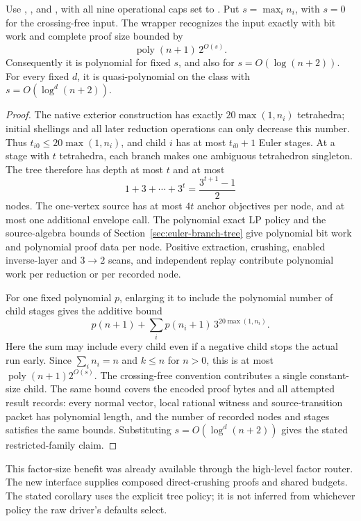 \begin{corollary}
\label{cor:factored-crushing-small-factors}
Use , ,
 and , with all
nine operational caps set to .  Put
$s=\max_i n_i$, with $s=0$ for the crossing-free input.  The wrapper
recognizes the input exactly with bit work and complete proof size bounded by
\[
 \operatorname{poly}(n+1)\,2^{O(s)}.
\]
Consequently it is polynomial for fixed $s$, and also for
$s=O(\log(n+2))$.  For every fixed $d$, it is quasi-polynomial on the
class with $s=O(\log^d(n+2))$.
\end{corollary}
\begin{proof}
The native exterior construction has exactly $20\max(1,n_i)$ tetrahedra;
initial shellings and all later reduction operations can only decrease
this number.  Thus $t_{i0}\le20\max(1,n_i)$, and child $i$ has at most
$t_{i0}+1$ Euler stages.  At a stage with $t$ tetrahedra, each branch makes
one ambiguous tetrahedron singleton.  The tree therefore has depth at
most $t$ and at most
\[
 1+3+\cdots+3^t=\frac{3^{t+1}-1}{2}
\]
nodes.  The one-vertex source has at most $4t$ anchor objectives per node,
and at most one additional envelope call.  The polynomial exact LP policy
and the source-algebra bounds of Section~\ref{sec:euler-branch-tree} give
polynomial bit work and polynomial proof data per node.  Positive extraction,
crushing, enabled inverse-layer and $3\to2$ scans, and independent replay contribute
polynomial work per reduction or per recorded node.

For one fixed polynomial $p$, enlarging it to include the polynomial number
of child stages gives the additive bound
\[
 p(n+1)+\sum_i p(n_i+1)\,3^{20\max(1,n_i)}.
\]
Here the sum may include every child even if a negative child stops the
actual run early.  Since $\sum_i n_i=n$ and $k\le n$ for $n>0$, this is
at most $\operatorname{poly}(n+1)2^{O(s)}$.  The crossing-free convention
contributes a single constant-size child.  The same bound covers the
encoded proof bytes and all attempted result records: every normal vector,
local rational witness and source-transition packet has polynomial length,
and the number of recorded nodes and stages satisfies the same bounds.
Substituting $s=O(\log^d(n+2))$ gives the stated restricted-family claim.
\end{proof}

This factor-size benefit was already available through the high-level
factor router.  The new interface supplies composed direct-crushing proofs
and shared budgets.  The stated corollary uses the explicit tree policy;
it is not inferred from whichever policy the raw driver's defaults select.

